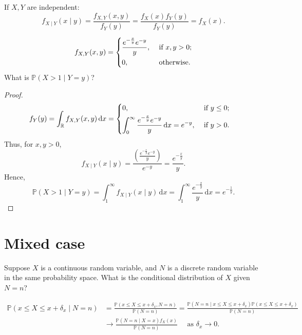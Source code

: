 \begin{remark}
    If \(X, Y\) are independent: 
    \[
        f_{X \mid Y}(x \mid y) = \frac{f_{X, Y}(x, y)}{f_Y(y)} = \frac{f_X(x) f_Y(y)}{f_Y(y)} = f_X(x).
    \] 
\end{remark}

\begin{eg}
    \[
        f_{X, Y}(x, y) = \begin{dcases}
            \frac{e^{- \frac{x}{y}} e^{-y}}{y}, &\text{ if } x, y > 0 ;\\
            0, &\text{ otherwise}.
        \end{dcases}
    \]
    What is \(\mathbb{P} (X > 1 \mid Y = y)\)? 
\end{eg}

\begin{proof}
    \begin{align*}
        f_Y(y) &= \int _\mathbb{R} f_{X, Y}(x, y) \, \mathrm{d} x = \begin{dcases}
            0, &\text{ if } y \le 0 ;\\
            \int _0^{\infty} \frac{e^{- \frac{x}{y}} e^{-y}}{y} \, \mathrm{d} x = e^{-y}, &\text{ if }y > 0.
        \end{dcases} 
    \end{align*}
    Thus, for \(x, y > 0\),
    \[
        f_{X \mid Y} (x \mid y) = \frac{ \left( \frac{e^{- \frac{x}{y}} e^{-y}}{y} \right) }{e^{-y}} = \frac{e^{- \frac{x}{y}}}{y}.
    \] 
    Hence, 
    \[
        \mathbb{P} (X > 1 \mid Y = y) = \int _1^{\infty} f_{X \mid Y} (x \mid y) \, \mathrm{d} x = \int _1^{\infty} \frac{e^{- \frac{x}{y}}}{y} \, \mathrm{d} x = e^{- \frac{1}{y}}.  
    \]
\end{proof}

\section{Mixed case}
Suppose \(X\) is a continuous random variable, and \(N\) is a discrete random variable in the same probability space. What is the conditional distribution of \(X\) given \(N = n\)? 

\begin{align*}
    \mathbb{P} (x \le X \le x + \delta _x \mid N = n) &= \frac{\mathbb{P} (x \le X \le x + \delta _x, N = n)}{\mathbb{P} (N = n)} = \frac{\mathbb{P} (N = n \mid x \le X \le x + \delta _x) \mathbb{P} (x \le X \le x + \delta _x)}{\mathbb{P} (N = n)} \\
    &\to \frac{\mathbb{P} (N = n \mid X = x) f_X(x)}{\mathbb{P} (N = n)} \quad \text{ as } \delta _x \to 0. 
\end{align*}


